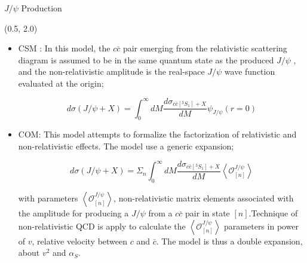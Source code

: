 \documentclass[10pt, xcolor={dvipsnames}, aspectratio = 169]{beamer}
\newcommand{\jpsi}{$J/\psi$ }
\begin{document}
\begin{frame}{\jpsi Production}

\begin{textblock}{14.0}(0.5, 2.0)
\begin{itemize}

\item CSM : In this model, the $c\bar{c}$ pair emerging from the relativistic scattering diagram is assumed to be in the
same quantum state as the produced \jpsi, and the non-relativistic amplitude is the real-space \jpsi wave function
evaluated at the origin;

\begin{equation*}
d\sigma (J/\psi+X) = \int_{0}^{\infty} dM \frac{d\sigma_{c\bar{c}[^{3}S_{1}] + X}}{dM} \psi_{J/\psi} (r=0)
\end{equation*}

\item COM: This model attempts to formalize the factorization of relativistic and non-relativistic effects. The model use
a generic expansion;

\begin{equation*}
d\sigma (J/\psi+X) = \Sigma_{n} \int_{0}^{\infty} dM \frac{d\sigma_{c\bar{c}[^{3}S_{1}] + X}}{dM} \left<\mathcal{O}^{J/\psi}_{[n]}\right>
\end{equation*}

with parameters $\left<\mathcal{O}^{J/\psi}_{[n]}\right>$, non-relativistic matrix elements associated with the amplitude
for producing a \jpsi from a $c\bar{c}$ pair in state $[n]$.Technique of non-relativistic QCD is apply to calculate the
$\left<\mathcal{O}^{J/\psi}_{[n]}\right>$ parameters in power of $v$, relative velocity between $c$ and $\bar{c}$.
The model is thus a double expansion, about $v^{2}$ and $\alpha_{S}$.

\end{itemize}
\end{textblock}

\end{frame}
\end{document}
